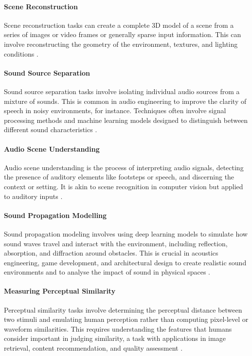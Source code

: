 \paragraph{Scene Reconstruction}
Scene reconstruction tasks can create a complete 3D model of a scene from a series of images or video frames or generally sparse input information. This can involve reconstructing the geometry of the environment, textures, and lighting conditions \citep{patow2003survey}.\par
\paragraph{Sound Source Separation}
Sound source separation tasks involve isolating individual audio sources from a mixture of sounds. This is common in audio engineering to improve the clarity of speech in noisy environments, for instance. Techniques often involve signal processing methods and machine learning models designed to distinguish between different sound characteristics \citep{virtanen2006sound}.\par
\paragraph{Audio Scene Understanding}
Audio scene understanding is the process of interpreting audio signals, detecting the presence of auditory elements like footsteps or speech, and discerning the context or setting. It is akin to scene recognition in computer vision but applied to auditory inputs \citep{abesser2020review}.\par
\paragraph{Sound Propagation Modelling}
Sound propagation modeling involves using deep learning models to simulate how sound waves travel and interact with the environment, including reflection, absorption, and diffraction around obstacles. This is crucial in acoustics engineering, game development, and architectural design to create realistic sound environments and to analyse the impact of sound in physical spaces \citep{liu2022sound}.\par
\paragraph{Measuring Perceptual Similarity}
Perceptual similarity tasks involve determining the perceptual distance between two stimuli and emulating human perception rather than computing pixel-level or waveform similarities. This requires understanding the features that humans consider important in judging similarity, a task with applications in image retrieval, content recommendation, and quality assessment \citep{Dolhasz_2020_CVPR}.\par
